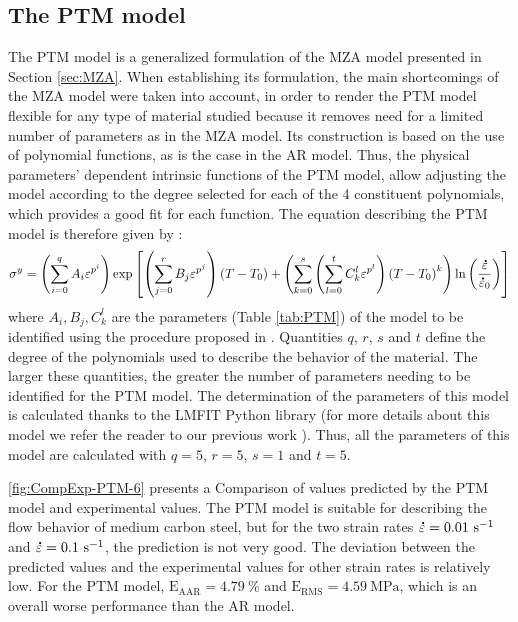 \documentclass[twoside,english,1p,final,sort&compress]{elsarticle}
\theoremstyle{plain}
\DeclareRobustCommand{\mdot}[1]{\accentset{\mbox{\bfseries .}}{#1}}
\DeclareRobustCommand{\RMSE}{\text{E}_\text{RMS}}
\DeclareRobustCommand{\AARE}{\text{E}_\text{AAR}}
\DeclareRobustCommand{\ps}{\text{s}^{-1}}
\DeclareRobustCommand{\MPa}{\text{MPa}}
\begin{document}
\subsection{The PTM model\label{sec:PTM}}

The PTM model \cite{TizeMha-2022} is a generalized formulation of the MZA model presented in Section \ref{sec:MZA}.
When establishing its formulation, the main shortcomings of the MZA model were taken into account, in order to render the PTM model flexible for any type of material studied because it removes need for a limited number of parameters as in the MZA model. Its construction is based on the use of polynomial functions, as is the case in the AR model. Thus, the physical parameters' dependent intrinsic functions of the PTM model, allow adjusting the model according to the degree selected for each of the 4 constituent polynomials, which provides a good fit for each function.
The equation describing the PTM model is therefore given by :
\begin{equation}
\label{eq:PTM-model}
\sigma^y = \left(\sum_{i=0}^{q}{A_i\varepsilon^{p^i}}\right) \exp\left[\left(\sum_{j=0}^{r}{B_j\varepsilon^{p^j}}\right)\left(T-T_0\right) + \left(\sum_{k=0}^{s}\left(\sum_{l=0}^{t}{C_k^l\varepsilon^{p^l}} \right)\left(T-T_0\right)^k \right)\ln\left( \frac{\mdot\varepsilon}{\mdot{\varepsilon}_0}\right)\right]
\end{equation}
where $A_i, B_j, C_k^l$ are the parameters (Table \ref{tab:PTM}) of the model to be identified using the procedure proposed in  \cite{TizeMha-2022}.
Quantities $q$, $r$, $s$ and $t$ define the degree of the polynomials used to describe the behavior of the material.
The larger these quantities, the greater the number of parameters needing to be identified for the PTM model. The determination of the parameters of this model is calculated thanks to the LMFIT Python library \cite{Newville-2016} (for more details about this model  we refer the reader to our previous work \cite{TizeMha-2022}). Thus, all the parameters of this model are calculated with $q=5$, $r=5$, $s=1$ and $t=5$.

\ref{fig:CompExp-PTM-6} presents a Comparison of values predicted by the PTM model and experimental values.
The PTM model is suitable for describing the flow behavior of medium carbon steel, but for the two strain rates $\mdot\varepsilon=0.01~\ps$ and $\mdot\varepsilon=0.1~\ps$, the prediction is not very good.
The deviation between the predicted values and the experimental values for other strain rates is relatively low. For the PTM model, $\AARE=4.79~\%$ and $\RMSE=4.59~\MPa$, which is an overall worse performance than the AR model.
\end{document}
